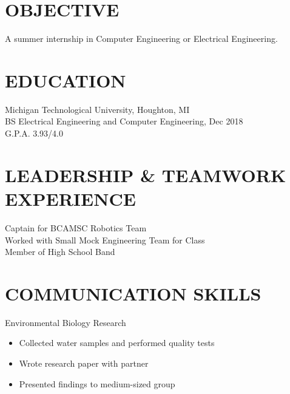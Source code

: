 \documentclass[letterpaper]{res}
\begin{document}
 


\address{\bf  PRESENT ADDRESS\\1801 Townsend Drive\\0217E East McNair\\Houghton, MI 49931}
\address{\bf PERMANENT ADDRESS \\ 14200 Stone Jug Road \\  Battle Creek, MI 49015 \\  (269) 262-6098 \\ jaevanko@mtu.edu}
                                  
\begin{resume}

\section{OBJECTIVE}          
    A summer internship in Computer Engineering or Electrical Engineering.          
 
\section{EDUCATION}          
    Michigan Technological University, Houghton, MI  \\        
    BS Electrical Engineering and Computer Engineering, Dec 2018   \\      
    G.P.A. 3.93/4.0          

\section{LEADERSHIP \& TEAMWORK EXPERIENCE}
	Captain for BCAMSC Robotics Team \\
	Worked with Small Mock Engineering Team for Class \\
	Member of High School Band

\section{COMMUNICATION SKILLS}
	Environmental Biology Research
	\begin{itemize} \itemsep1pt \parskip0pt 
		\item Collected water samples and performed quality tests
		\item Wrote research paper with partner
		\item Presented findings to medium-sized group
	\end{itemize}


\end{resume}
\end{document}
